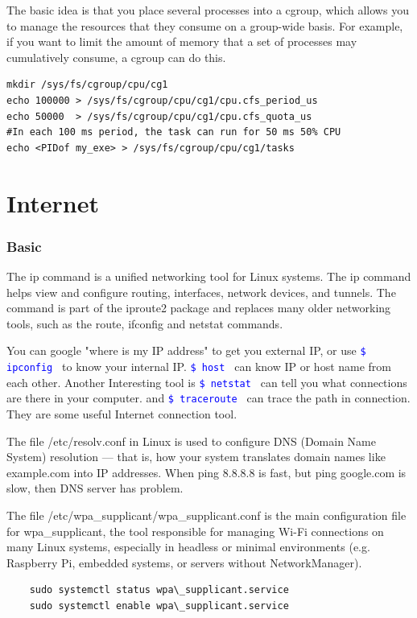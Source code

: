 \documentclass[paper=8.5in:11in, twoside, 12pt, pagesize=pdftex]{book}
\newcommand{\linuxcommand}[1]{\texttt{\textcolor{blue}{\$ #1 \Pisymbol{psy}{191}}}}
\begin{document}
The basic idea is that you place several processes into a cgroup, which
allows you to manage the resources that they consume on a group-wide
basis. For example, if you want to limit the amount of memory that a set of processes may cumulatively consume, a cgroup can do this.

\begin{lstlisting}
mkdir /sys/fs/cgroup/cpu/cg1
echo 100000 > /sys/fs/cgroup/cpu/cg1/cpu.cfs_period_us 
echo 50000  > /sys/fs/cgroup/cpu/cg1/cpu.cfs_quota_us
#In each 100 ms period, the task can run for 50 ms 50% CPU
echo <PIDof my_exe> > /sys/fs/cgroup/cpu/cg1/tasks
\end{lstlisting}


\section{Internet}

\subsubsection{Basic}

	\par The ip command is a unified networking tool for Linux systems. The ip command helps view and configure routing, interfaces, network devices, and tunnels. The command is part of the iproute2 package and replaces many older networking tools, such as the route, ifconfig and netstat commands. 
	
	\par You can google "where is my IP address" to get you external IP, or use \linuxcommand{ipconfig} to know your internal IP. \linuxcommand{host} can know IP or host name from each other. Another Interesting tool is \linuxcommand{netstat} can tell you what connections are there in your computer. and \linuxcommand{traceroute} can trace the path in connection. They are some useful Internet connection tool.
	
		\par The file /etc/resolv.conf in Linux is used to configure DNS (Domain Name System) resolution — that is, how your system translates domain names like example.com into IP addresses. When ping 8.8.8.8 is fast, but ping google.com is slow, then DNS server has problem. 
	
		\par The file /etc/wpa\_supplicant/wpa\_supplicant.conf is the main configuration file for wpa\_supplicant, the tool responsible for managing Wi-Fi connections on many Linux systems, especially in headless or minimal environments (e.g. Raspberry Pi, embedded systems, or servers without NetworkManager).
	\begin{lstlisting}
	sudo systemctl status wpa\_supplicant.service
	sudo systemctl enable wpa\_supplicant.service
	\end{lstlisting}
	
\end{document}
